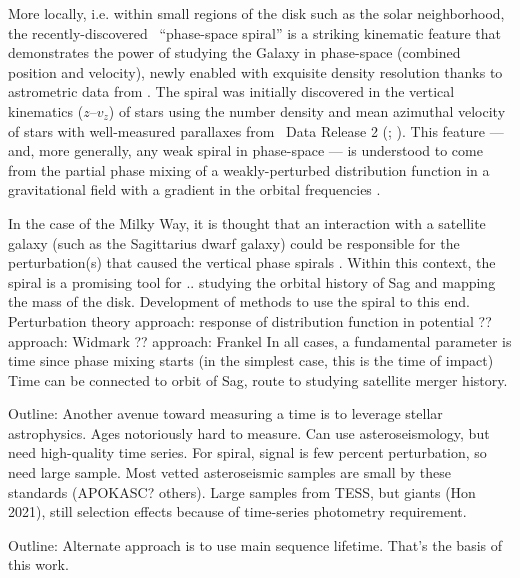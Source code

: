 More locally, i.e. within small regions of the disk such as the solar neighborhood, the recently-discovered \gaia\ ``phase-space spiral'' is a striking kinematic feature that demonstrates the power of studying the Galaxy in phase-space (combined position and velocity), newly enabled with exquisite density resolution thanks to astrometric data from \gaia.
The spiral was initially discovered in the vertical kinematics ($z$--$v_z$) of stars using the number density and mean azimuthal velocity of stars with well-measured parallaxes from \gaia\ Data Release 2 (; \citealt{Antoja:2018}).
This feature --- and, more generally, any weak spiral in phase-space --- is understood to come from the partial phase mixing of a weakly-perturbed distribution function in a gravitational field with a gradient in the orbital frequencies \citep[e.g.,][]{Tremaine:1999, Binney:2018}.

In the case of the Milky Way, it is thought that an interaction with a satellite galaxy
(such as the Sagittarius dwarf galaxy) could be responsible for the perturbation(s) that
caused the vertical phase spirals \citep[e.g.,][]{Antoja:2018, Laporte:2019,
Darling:2019}.
Within this context, the spiral is a promising tool for .. studying the orbital history of Sag and mapping the mass of the disk.
Development of methods to use the spiral to this end.
Perturbation theory approach: response of distribution function in potential \citep{Banik}
?? approach: Widmark
?? approach: Frankel
In all cases, a fundamental parameter is time since phase mixing starts (in the simplest case, this is the time of impact)
Time can be connected to orbit of Sag, route to studying satellite merger history.

Outline: Another avenue toward measuring a time is to leverage stellar astrophysics. Ages notoriously hard to measure. Can use asteroseismology, but need high-quality time series. For spiral, signal is few percent perturbation, so need large sample. Most vetted asteroseismic samples are small by these standards (APOKASC? others). Large samples from TESS, but giants (Hon 2021), still selection effects because of time-series photometry requirement.

Outline: Alternate approach is to use main sequence lifetime. That's the basis of this work.




